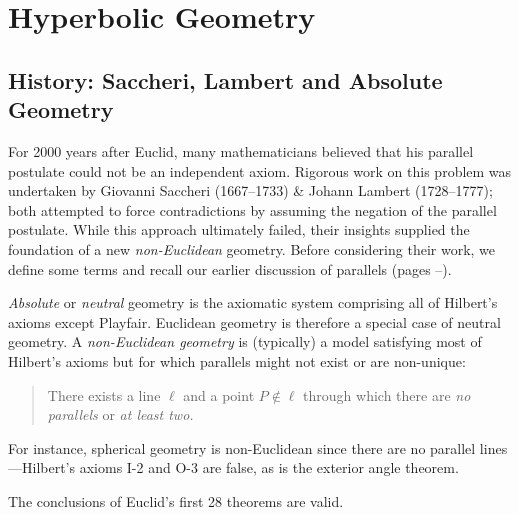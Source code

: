 \graphicspath{{4hyper/asy/}}

\section{Hyperbolic Geometry}\label{chap:hyper}

\subsection{History: Saccheri, Lambert and Absolute Geometry}\label{sec:hyp1}

For 2000 years after Euclid, many mathematicians believed that his parallel postulate could not be an independent axiom. Rigorous work on this problem was undertaken by Giovanni Saccheri (1667--1733) \& Johann Lambert (1728--1777); both attempted to force contradictions by assuming the negation of the parallel postulate. While this approach ultimately failed, their insights supplied the foundation of a new \emph{non-Euclidean} geometry. Before considering their work, we define some terms and recall our earlier discussion of parallels (pages \pageref{pg:parallelexist}--\pageref*{pg:pythagoras}).

\begin{defn}{}{}
	\emph{Absolute} or \emph{neutral} geometry is the axiomatic system comprising all of Hilbert's axioms except Playfair. Euclidean geometry is therefore a special case of neutral geometry.\smallbreak
	A \emph{non-Euclidean geometry} is (typically) a model satisfying most of Hilbert's axioms but for which parallels might not exist or are non-unique:
	\begin{quote}
		There exists a line $\ell$ and a point $P\not\in\ell$ through which there are \emph{no parallels} or \emph{at least two.}
	\end{quote}
\end{defn}

For instance, spherical geometry is non-Euclidean since there are no parallel lines---Hilbert's axioms I-2 and O-3 are false, as is the exterior angle theorem.



The conclusions of Euclid's first 28 theorems are valid.


